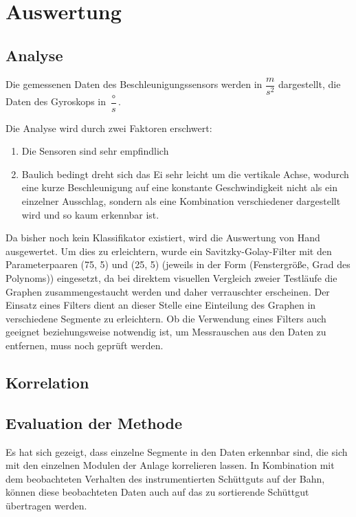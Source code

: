 \section{Auswertung}
\subsection{Analyse}
Die gemessenen Daten des Beschleunigungssensors werden in $\dfrac{m}{s^{2}}$ 
dargestellt, die Daten des Gyroskops in $\dfrac{\circ}{s}$.

Die Analyse wird durch zwei Faktoren erschwert:
\begin{enumerate}
	\item Die Sensoren sind sehr empfindlich
	\item Baulich bedingt dreht sich das Ei sehr leicht um die vertikale Achse, wodurch eine kurze Beschleunigung auf eine konstante Geschwindigkeit nicht als ein einzelner Ausschlag, sondern als eine Kombination verschiedener dargestellt wird und so kaum erkennbar ist.
\end{enumerate}

Da bisher noch kein Klassifikator existiert, wird die Auswertung von Hand ausgewertet. Um dies zu erleichtern, wurde ein Savitzky-Golay-Filter mit den Parameterpaaren (75, 5) und (25, 5) (jeweils in der Form (Fenstergröße, Grad des Polynoms)) eingesetzt, da bei direktem visuellen Vergleich zweier Testläufe die Graphen zusammengestaucht werden und daher verrauschter erscheinen. Der Einsatz eines Filters dient an dieser Stelle eine Einteilung des Graphen in verschiedene Segmente zu erleichtern.
Ob die Verwendung eines Filters auch geeignet beziehungsweise notwendig ist, um Messrauschen aus den Daten zu entfernen, muss noch geprüft werden.


\subsection{Korrelation}


\subsection{Evaluation der Methode}

Es hat sich gezeigt, dass einzelne Segmente in den Daten erkennbar sind, die sich mit den einzelnen Modulen der Anlage korrelieren lassen. In Kombination mit dem beobachteten Verhalten des instrumentierten Schüttguts auf der Bahn, können diese beobachteten Daten auch auf das zu sortierende Schüttgut übertragen werden.
 
